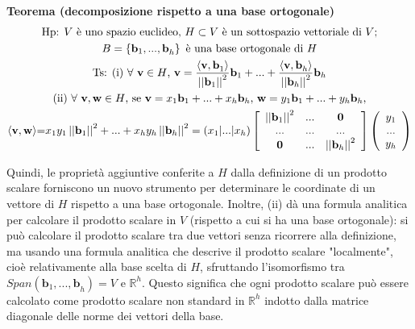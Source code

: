 \documentclass{article}
\begin{document}
\textbf{Teorema (decomposizione rispetto a una base ortogonale)}%
\begin{gather*}
\text{Hp}\text{: }V\text{ \`{e} uno spazio euclideo, }H\subset V\text{ \`{e}
un sottospazio vettoriale di }V\text{;} \\
B=\left\{ \mathbf{b}_{1}\mathbf{,...,b}_{h}\right\} \text{ \`{e} una base
ortogonale di }H \\
\text{Ts}\text{: (i) }\forall \text{ }\mathbf{v}\in H\text{, }\mathbf{v}=%
\frac{\langle \mathbf{v,b}_{1}\mathbf{\rangle }}{\left\vert \left\vert 
\mathbf{b}_{1}\right\vert \right\vert ^{2}}\mathbf{b}_{1}+...+\frac{\langle 
\mathbf{v,b}_{h}\mathbf{\rangle }}{\left\vert \left\vert \mathbf{b}%
_{h}\right\vert \right\vert ^{2}}\mathbf{b}_{h} \\
\text{(ii) }\forall \text{ }\mathbf{v,w}\in H\text{, se }\mathbf{v}=x_{1}%
\mathbf{b}_{1}+...+x_{h}\mathbf{b}_{h}\text{, }\mathbf{w}=y_{1}\mathbf{b}%
_{1}+...+y_{h}\mathbf{b}_{h}\text{,} \\
\langle \mathbf{v,w\rangle }\mathbf{=}x_{1}y_{1}\left\vert \left\vert 
\mathbf{b}_{1}\right\vert \right\vert ^{2}+...+x_{h}y_{h}\left\vert
\left\vert \mathbf{b}_{h}\right\vert \right\vert ^{2}=\left(
x_{1}|...|x_{h}\right) \left[ 
\begin{array}{ccc}
\left\vert \left\vert \mathbf{b}_{1}\right\vert \right\vert ^{2} & \mathbf{%
...} & \mathbf{0} \\ 
\mathbf{...} & \mathbf{...} & \mathbf{...} \\ 
\mathbf{0} & \mathbf{...} & \left\vert \left\vert \mathbf{b}_{h}\right\vert
\right\vert ^{2}%
\end{array}%
\right] \left( 
\begin{array}{c}
y_{1} \\ 
... \\ 
y_{h}%
\end{array}%
\right) 
\end{gather*}

Quindi, le propriet\`{a} aggiuntive conferite a $H$ dalla definizione di un
prodotto scalare forniscono un nuovo strumento per determinare le coordinate
di un vettore di $H$ rispetto a una base ortogonale. Inoltre, (ii) d\`{a}
una formula analitica per calcolare il prodotto scalare in $V$ (rispetto a
cui si ha una base ortogonale): si pu\`{o} calcolare il prodotto scalare tra
due vettori senza ricorrere alla definizione, ma usando una formula
analitica che descrive il prodotto scalare "localmente", cio\`{e}
relativamente alla base scelta di $H$, sfruttando l'isomorfismo tra $%
Span\left( \mathbf{b}_{1}\mathbf{,...,b}_{h}\right) =V$ e $%
\mathbb{R}
^{h}$. Questo significa che ogni prodotto scalare pu\`{o} essere calcolato
come prodotto scalare non standard in $%
\mathbb{R}
^{h}$ indotto dalla matrice diagonale delle norme dei vettori della base.
\end{document}
